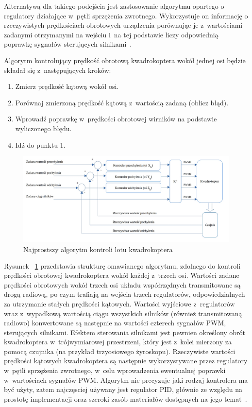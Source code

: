 \documentclass[11pt, twoside]{Thesis} %
\begin{document}
Alternatywą dla takiego podejścia jest zastosowanie algorytmu opartego o regulatory działające w~pętli sprzężenia zwrotnego. Wykorzystuje on informację o rzeczywistych prędkościach obrotowych urządzenia porównując je z~wartościami zadanymi otrzymanymi na wejściu i~na tej podstawie liczy odpowiednią poprawkę sygnałów sterujących silnikami~\cite{quadro9}. 

Algorytm kontrolujący prędkość obrotową kwadrokoptera wokół jednej osi będzie składał się z~następujących kroków:

\begin{enumerate}
	\item Zmierz prędkość kątową wokół osi.
	\item Porównaj zmierzoną prędkość kątową z~wartością zadaną (oblicz błąd).
	\item Wprowadź poprawkę w~prędkości obrotowej wirników na podstawie wyliczonego błędu.
	\item Idź do punktu 1.
\end{enumerate}


\begin{figure}[H]
	\centering
	\includegraphics[width=1.1\textwidth]{Pictures/rate_controll_algorithm2.png}
		\caption[Najprostszy algorytm kontroli lotu kwadrokoptera]{Najprostszy algorytm kontroli lotu kwadrokoptera}
	\label{fig:rate_controll_algorithm}
\end{figure}

Rysunek ~\ref{fig:rate_controll_algorithm} przedstawia strukturę omawianego algorytmu, zdolnego do kontroli prędkości obrotowej kwadrokoptera wokół każdej z~trzech osi. Wartości zadane prędkości obrotowych wokół trzech osi układu współrzędnych transmitowane są drogą radiową, po czym trafiają na wejścia trzech regulatorów, odpowiedzialnych za utrzymanie stałych prędkości kątowych. Wartości wyjściowe z~regulatorów wraz z~wypadkową wartością ciągu wszystkich silników (również transmitowaną radiowo) konwertowane są następnie na wartości czterech sygnałów PWM, sterujących silnikami. Efektem sterowania silnikami jest pewnien określony obrót kwadrokoptera w~trójwymiarowej przestrzeni, który jest z~kolei mierzony za pomocą czujnika (na przykład trzyosiowego żyroskopu). Rzeczywiste wartości prędkości kątowych kwadrokoptera są następnie wykorzystywane przez regulatory w~pętli sprzężenia zwrotnego, w~celu wprowadzenia ewentualnej poprawki w~wartościach sygnałów PWM. Algorytm nie precyzuje jaki rodzaj kontrolera ma być użyty, zatem najczęsciej używany jest regulator PID, głównie ze względu na prostotę implementacji oraz szeroki zasób materiałów dostępnych na jego temat~\cite{quadro9}.
\end{document}
